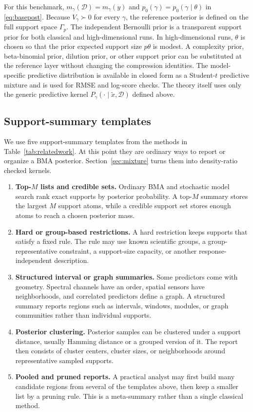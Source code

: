 \documentclass[twoside,11pt]{article}
\newcommand{\D}{\mathcal{D}}
\begin{document}
For this benchmark, \(m_\gamma(\D)=m_\gamma(y)\) and \(p_0(\gamma)=p_0(\gamma\mid\theta)\) in \eqref{eq:basepost}. Because \(V_\gamma\succ0\) for every \(\gamma\), the reference posterior is defined on the full support space \(\Gamma_p\). The independent Bernoulli prior is a transparent support prior for both classical and high-dimensional runs. In high-dimensional runs, \(\theta\) is chosen so that the prior expected support size \(p\theta\) is modest. A complexity prior, beta-binomial prior, dilution prior, or other support prior can be substituted at the reference layer without changing the compression identities. The model-specific predictive distribution is available in closed form as a Student-\(t\) predictive mixture and is used for RMSE and log-score checks. The theory itself uses only the generic predictive kernel \(P_\gamma(\cdot\mid\tilde x,\D)\) defined above.

\subsection{Support-summary templates}
\label{subsec:existingsummaries}

We use five support-summary templates from the methods in Table~\ref{tab:relatedwork}. At this point they are ordinary ways to report or organize a BMA posterior. Section~\ref{sec:mixture} turns them into density-ratio checked kernels.
\begin{enumerate}[leftmargin=*,itemsep=0.25em]
\item \textbf{Top-\(M\) lists and credible sets.} Ordinary BMA and stochastic model search rank exact supports by posterior probability. A top-\(M\) summary stores the largest \(M\) support atoms, while a credible support set stores enough atoms to reach a chosen posterior mass.
\item \textbf{Hard or group-based restrictions.} A hard restriction keeps supports that satisfy a fixed rule. The rule may use known scientific groups, a group-representative constraint, a support-size capacity, or another response-independent description.
\item \textbf{Structured interval or graph summaries.} Some predictors come with geometry. Spectral channels have an order, spatial sensors have neighborhoods, and correlated predictors define a graph. A structured summary reports regions such as intervals, windows, modules, or graph communities rather than individual supports.
\item \textbf{Posterior clustering.} Posterior samples can be clustered under a support distance, usually Hamming distance or a grouped version of it. The report then consists of cluster centers, cluster sizes, or neighborhoods around representative sampled supports.
\item \textbf{Pooled and pruned reports.} A practical analyst may first build many candidate regions from several of the templates above, then keep a smaller list by a pruning rule. This is a meta-summary rather than a single classical method.
\end{enumerate}
\end{document}
